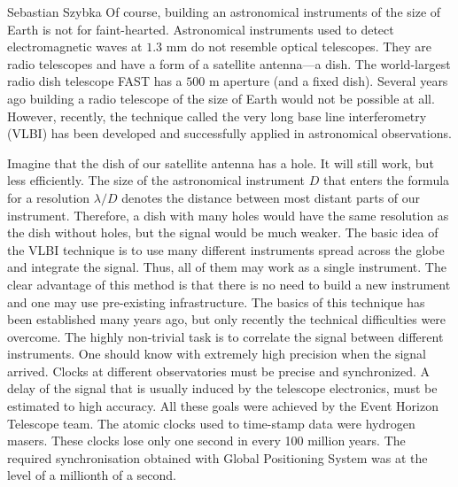 \begin{artengenv}{Sebastian Szybka}
Of course, building an astronomical instruments of the size of Earth is not for faint-hearted. Astronomical instruments used to detect electromagnetic waves at $1.3$ mm do not resemble optical telescopes. They are radio telescopes and have a form of a satellite antenna---a dish. The world-largest radio dish telescope FAST has a $500$ m aperture (and a fixed dish). Several years ago building a radio telescope of the size of Earth would not be possible at all. However, recently, the technique called the very long base line interferometry (VLBI) has been developed and successfully applied in astronomical observations. 

Imagine that the dish of our satellite antenna has a hole. It will still work, but less efficiently. The size of the astronomical instrument $D$ that enters the formula for a resolution $\lambda/D$ denotes the distance between most distant parts of our instrument. Therefore, a dish with many holes would have the same resolution as the dish without holes, but the signal would be much weaker. The basic idea of the VLBI technique is to use many different instruments spread across the globe and integrate the signal. Thus, all of them may work as a single instrument. The clear advantage of this method is that there is no need to build a new instrument and one may use pre-existing infrastructure. The basics of this technique has been established many years ago, but only recently the technical difficulties were overcome. The highly non-trivial task is to correlate the signal between different instruments. One should know with extremely high precision when the signal arrived. Clocks at different observatories must be precise and synchronized. A delay of the signal that is usually induced by the telescope electronics, must be estimated to high accuracy. All these goals were achieved by the Event Horizon Telescope team. The atomic clocks used to time-stamp data were hydrogen masers. These clocks lose only one second in every 100 million years. The required synchronisation obtained with Global Positioning System was at the level of a millionth of a second.


\end{artengenv}

